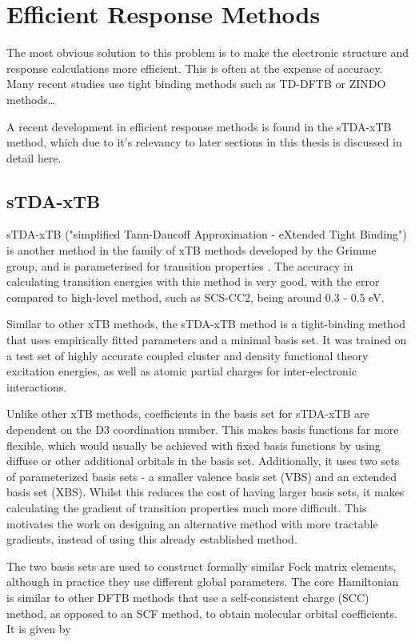 \section{Efficient Response Methods}
\label{sec:efficient_response_methods}

The most obvious solution to this problem is to make the electronic structure and
response calculations more efficient. This is often at the expense of accuracy.
Many recent studies use tight binding methods such as TD-DFTB or ZINDO methods\dots


A recent development in efficient response methods is found in the sTDA-xTB method,
which due to it's relevancy to later sections in this thesis is discussed in detail
here.

\subsection{sTDA-xTB}
\label{subsec:stda_xtb}
sTDA-xTB ("simplified Tann-Dancoff Approximation - eXtended Tight Binding") is another
method in the family of xTB methods developed by the Grimme group, and is parameterised
for transition properties \cite{Grimme2016}. The accuracy in calculating transition energies with this
method is very good, with the error compared to high-level method, such as SCS-CC2,
being around 0.3 - 0.5 eV.

Similar to other xTB methods, the sTDA-xTB method is a tight-binding method that
uses empirically fitted parameters and a minimal basis set. It was trained on a
test set of highly accurate coupled cluster and density functional theory
excitation energies, as well as atomic partial charges for inter-electronic interactions.

Unlike other xTB methods, coefficients in the basis set for sTDA-xTB are dependent on the D3
coordination number. This makes basis functions far more flexible, which would usually
be achieved with fixed basis functions by using diffuse or other additional orbitals in
the basis set. Additionally, it uses two sets of parameterized basis sets - a
smaller valence basis set (VBS) and an extended basis set (XBS). Whilst this reduces
the cost of having larger basis sets, it makes calculating the gradient of transition
properties much more difficult. This motivates the work on designing an alternative
method with more tractable gradients, instead of using this already established method.

The two basis sets are used to construct formally similar Fock matrix elements,
although in practice they use different global parameters. The core Hamiltonian
is similar to other DFTB methods that use a self-consistent charge (SCC) method, as
opposed to an SCF method, to obtain molecular orbital coefficients. It is given by

